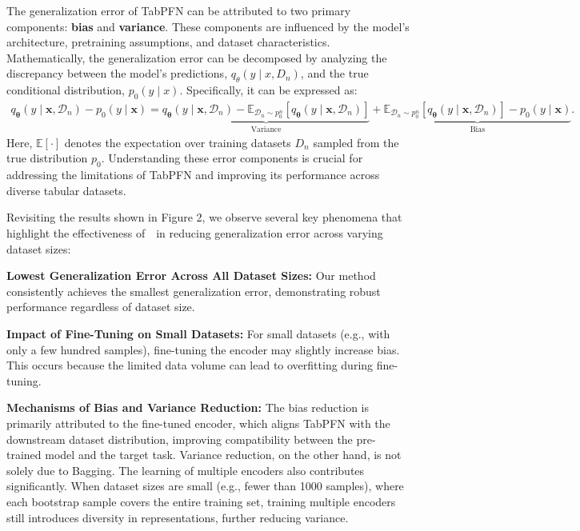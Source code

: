 The generalization error of TabPFN can be attributed to two primary components: \textbf{bias} and \textbf{variance}. These components are influenced by the model’s architecture, pretraining assumptions, and dataset characteristics. Mathematically, the generalization error can be decomposed by analyzing the discrepancy between the model’s predictions, \( q_\theta(y \mid x, D_n) \), and the true conditional distribution, \( p_0(y \mid x) \). Specifically, it can be expressed as:
\begin{equation}    
\begin{aligned} 
    q_{\boldsymbol{\theta}}\left(y \mid \boldsymbol{x}, \mathcal{D}_{n}\right) - p_{0}(y \mid \boldsymbol{x}) 
    =  \underbrace{q_{\boldsymbol{\theta}}\left(y \mid \boldsymbol{x}, \mathcal{D}_{n}\right) - \mathbb{E}_{\mathcal{D}_{n} \sim p_{0}^{n}}\left[q_{\boldsymbol{\theta}}\left(y \mid \boldsymbol{x}, \mathcal{D}_{n}\right)\right]}_{\text{Variance}} 
     + \underbrace{\mathbb{E}_{\mathcal{D}_{n} \sim p_{0}^{n}}\left[q_{\boldsymbol{\theta}}\left(y \mid \boldsymbol{x}, \mathcal{D}_{n}\right)\right] - p_{0}(y \mid \boldsymbol{x})}_{\text{Bias}}.
     \label{eq:bias-var}
\end{aligned}
\end{equation}
Here, \( \mathbb{E}[\cdot] \) denotes the expectation over training datasets \( D_n \) sampled from the true distribution \( p_0 \). Understanding these error components is crucial for addressing the limitations of TabPFN and improving its performance across diverse tabular datasets.

Revisiting the results shown in Figure 2, we observe several key phenomena that highlight the effectiveness of~\name~in reducing generalization error across varying dataset sizes:

\textbf{Lowest Generalization Error Across All Dataset Sizes:}  
Our method consistently achieves the smallest generalization error, demonstrating robust performance regardless of dataset size.

\textbf{Impact of Fine-Tuning on Small Datasets:}  
For small datasets (e.g., with only a few hundred samples), fine-tuning the encoder may slightly increase bias. This occurs because the limited data volume can lead to overfitting during fine-tuning.

\textbf{Mechanisms of Bias and Variance Reduction:}  
The bias reduction is primarily attributed to the fine-tuned encoder, which aligns TabPFN with the downstream dataset distribution, improving compatibility between the pre-trained model and the target task. Variance reduction, on the other hand, is not solely due to Bagging. The learning of multiple encoders also contributes significantly. When dataset sizes are small (e.g., fewer than 1000 samples), where each bootstrap sample covers the entire training set, training multiple encoders still introduces diversity in representations, further reducing variance.

